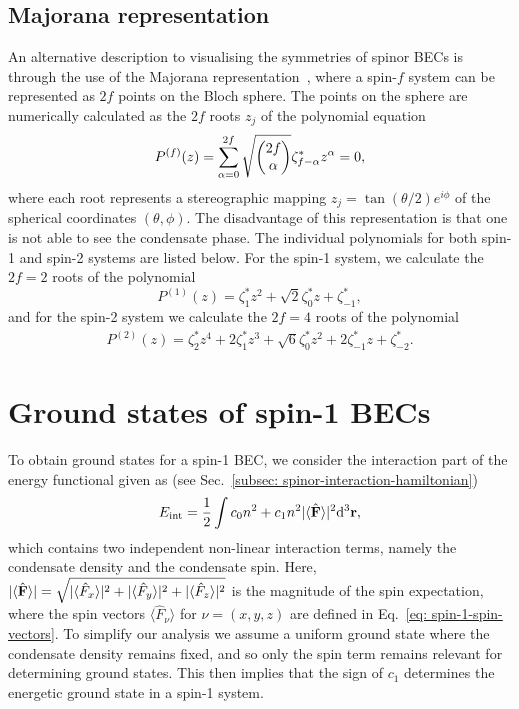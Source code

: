 \subsection{Majorana representation}
An alternative description to visualising the symmetries of spinor BECs is
through the use of the Majorana representation~\cite{Majorana1932,Bloch1945},
where a spin-\(f\) system can be represented as \(2f\) points on the Bloch
sphere.
The points on the sphere are numerically calculated as the \(2f\) roots
\(z_j\) of the polynomial equation
\begin{equation}
    P^{(f)}(z) = \sum_{\alpha = 0}^{2f}
    \sqrt{\mqty(2f \\ \alpha)}\zeta_{f-\alpha}^*z^\alpha=0,
\end{equation}
where each root represents a stereographic mapping
\(z_j=\tan(\theta/2)e^{i\phi}\) of the spherical coordinates \((\theta, \phi)\).
The disadvantage of this representation is that one is not able to see the
condensate phase.
The individual polynomials for both spin-1 and spin-2 systems are listed below.
For the spin-1 system, we calculate the \(2f=2\) roots of the polynomial
\begin{equation}
    P^{(1)}(z) = \zeta_1^*z^2+\sqrt{2}\zeta_0^*z+\zeta_{-1}^*,
\end{equation}
and for the spin-2 system we calculate the \(2f=4\) roots of the polynomial
\begin{align}
    P^{(2)}(z) = \zeta_2^*z^4 + 2\zeta_1^*z^3 + \sqrt{6}\zeta_0^*z^2
    + 2\zeta_{-1}^*z + \zeta_{-2}^*.
\end{align}

\section{Ground states of spin-1 BECs}\label{sec: ground-states-spin-1}
To obtain ground states for a spin-1 BEC, we consider the interaction part of
the energy functional given as (see
Sec.~\ref{subsec: spinor-interaction-hamiltonian})
\begin{align}\label{eq: spin-1-int-energy}
    E_\mathrm{int} = \frac{1}{2}\int c_0n^2+c_1n^2|\langle \hat{\vb{F}} \rangle |^2 \dd^3\vb{r},
\end{align}
which contains two independent non-linear interaction terms, namely the
condensate density and the condensate spin.
Here, \(|\langle \hat{\vb{F}} \rangle | = \sqrt{|\langle\hat{F}_x\rangle|^2
+ |\langle\hat{F}_y\rangle|^2 + |\langle\hat{F}_z\rangle|^2}\) is the
magnitude of the spin expectation, where the spin vectors
\(\langle\hat{F}_\nu\rangle \) for \(\nu = (x, y, z)\) are defined in
Eq.~\eqref{eq: spin-1-spin-vectors}.
To simplify our analysis we assume a uniform ground state where the condensate
density remains fixed, and so only the spin term remains relevant for
determining ground states.
This then implies that the sign of \(c_1\) determines the energetic ground state
in a spin-1 system.

